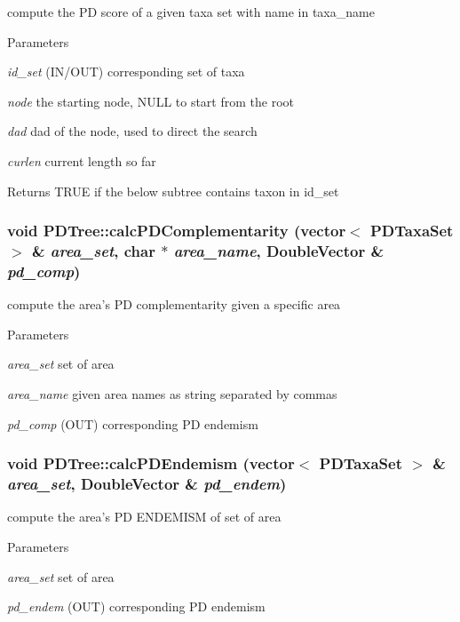 \label{classPDTree_a0f7b9ac448266270a1e9d3d18218dc2e}
compute the PD score of a given taxa set with name in taxa\_\-name 
\begin{DoxyParams}{Parameters}
\item[{\em id\_\-set}](IN/OUT) corresponding set of taxa \item[{\em node}]the starting node, NULL to start from the root \item[{\em dad}]dad of the node, used to direct the search \item[{\em curlen}]current length so far \end{DoxyParams}
\begin{DoxyReturn}{Returns}
TRUE if the below subtree contains taxon in id\_\-set 
\end{DoxyReturn}
\hypertarget{classPDTree_acc3ea0e90a8788dcdea8d268a7139d31}{
\subsubsection[{calcPDComplementarity}]{\setlength{\rightskip}{0pt plus 5cm}void PDTree::calcPDComplementarity (vector$<$ {\bf PDTaxaSet} $>$ \& {\em area\_\-set}, \/  char $\ast$ {\em area\_\-name}, \/  DoubleVector \& {\em pd\_\-comp})}}
\label{classPDTree_acc3ea0e90a8788dcdea8d268a7139d31}
compute the area's PD complementarity given a specific area 
\begin{DoxyParams}{Parameters}
\item[{\em area\_\-set}]set of area \item[{\em area\_\-name}]given area names as string separated by commas \item[{\em pd\_\-comp}](OUT) corresponding PD endemism \end{DoxyParams}
\hypertarget{classPDTree_ade969be738be4cf02944a1093bfbb52d}{
\subsubsection[{calcPDEndemism}]{\setlength{\rightskip}{0pt plus 5cm}void PDTree::calcPDEndemism (vector$<$ {\bf PDTaxaSet} $>$ \& {\em area\_\-set}, \/  DoubleVector \& {\em pd\_\-endem})}}
\label{classPDTree_ade969be738be4cf02944a1093bfbb52d}
compute the area's PD ENDEMISM of set of area 
\begin{DoxyParams}{Parameters}
\item[{\em area\_\-set}]set of area \item[{\em pd\_\-endem}](OUT) corresponding PD endemism \end{DoxyParams}

